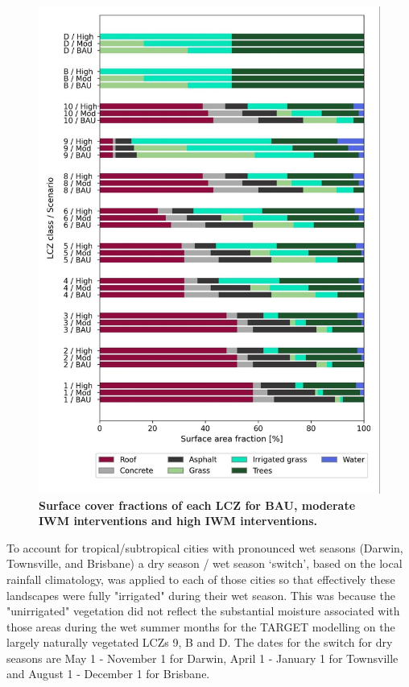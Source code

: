 \documentclass[utf8]{frontiersSCNS} %
\begin{document}
\begin{figure}
\centering
\includegraphics[trim={0 0 0 0},clip,scale=0.20]{images/image7.jpg}
\caption{\bf Surface cover fractions of each LCZ for BAU, moderate IWM interventions and high IWM interventions.}
 \label{fig:surflcz}
\end{figure}

To account for tropical/subtropical cities with pronounced wet seasons (Darwin, Townsville, and Brisbane) a dry season / wet season `switch', based on the local rainfall climatology, was applied to each of those cities so that effectively these landscapes were fully "irrigated" during their wet season. This was because the "unirrigated" vegetation did not reflect the substantial moisture associated with those areas during the wet summer months for the TARGET modelling on the largely naturally vegetated LCZs 9, B and D. The dates for the switch for dry seasons are May 1 - November 1 for Darwin, April 1 - January 1 for Townsville and August 1 - December 1 for Brisbane. 
\end{document}
